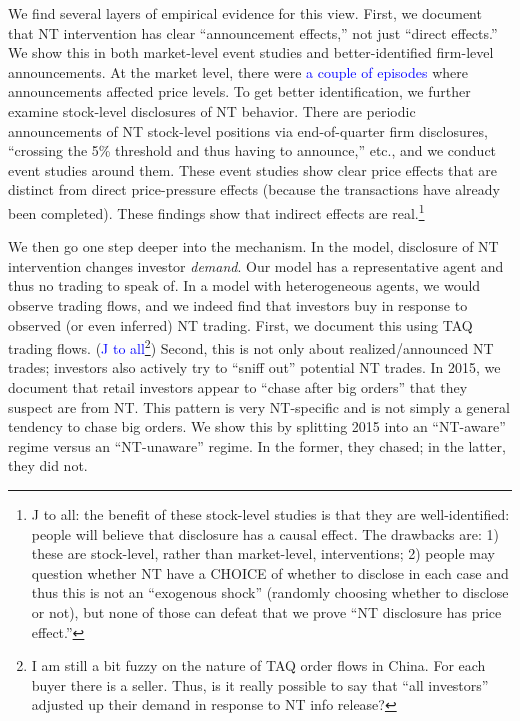 \documentclass[12pt]{article}
\begin{document}
We find several layers of empirical evidence for this view. First, we document that NT intervention has clear ``announcement effects,'' not just ``direct effects.'' We show this in both market-level event studies and better-identified firm-level announcements. At the market level, there were \textcolor{blue}{a couple of episodes} where announcements affected price levels. To get better identification, we further examine stock-level disclosures of NT behavior. There are periodic announcements of NT stock-level positions via end-of-quarter firm disclosures, ``crossing the 5\% threshold and thus having to announce,'' etc., and we conduct event studies around them. These event studies show clear price effects that are distinct from direct price-pressure effects (because the transactions have already been completed). These findings show that indirect effects are real.\footnote{J to all: the benefit of these stock-level studies is that they are well-identified: people will believe that disclosure has a causal effect. The drawbacks are: 1) these are stock-level, rather than market-level, interventions; 2) people may question whether NT have a CHOICE of whether to disclose in each case and thus this is not an ``exogenous shock'' (randomly choosing whether to disclose or not), but none of those can defeat that we prove ``NT disclosure has price effect.''}

We then go one step deeper into the mechanism. In the model, disclosure of NT intervention changes investor \textit{demand}. Our model has a representative agent and thus no trading to speak of. In a model with heterogeneous agents, we would observe trading flows, and we indeed find that investors buy in response to observed (or even inferred) NT trading. First, we document this using TAQ trading flows. (\textcolor{blue}{J to all\footnote{I am still a bit fuzzy on the nature of TAQ order flows in China. For each buyer there is a seller. Thus, is it really possible to say that ``all investors'' adjusted up their demand in response to NT info release?}}) Second, this is not only about realized/announced NT trades; investors also actively try to ``sniff out'' potential NT trades. In 2015, we document that retail investors appear to ``chase after big orders'' that they suspect are from NT. This pattern is very NT-specific and is not simply a general tendency to chase big orders. We show this by splitting 2015 into an ``NT-aware'' regime versus an ``NT-unaware'' regime. In the former, they chased; in the latter, they did not.
\end{document}
